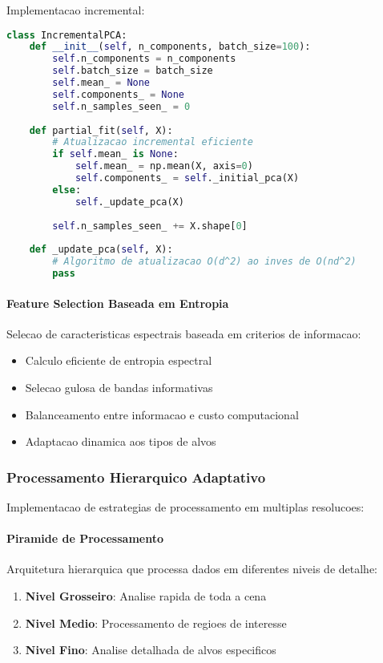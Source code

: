 Implementacao incremental:
\begin{lstlisting}[language=Python]
class IncrementalPCA:
    def __init__(self, n_components, batch_size=100):
        self.n_components = n_components
        self.batch_size = batch_size
        self.mean_ = None
        self.components_ = None
        self.n_samples_seen_ = 0
    
    def partial_fit(self, X):
        # Atualizacao incremental eficiente
        if self.mean_ is None:
            self.mean_ = np.mean(X, axis=0)
            self.components_ = self._initial_pca(X)
        else:
            self._update_pca(X)
        
        self.n_samples_seen_ += X.shape[0]
    
    def _update_pca(self, X):
        # Algoritmo de atualizacao O(d^2) ao inves de O(nd^2)
        pass
\end{lstlisting}

\paragraph{Feature Selection Baseada em Entropia}
Selecao de caracteristicas espectrais baseada em criterios de informacao:
\begin{itemize}
    \item Calculo eficiente de entropia espectral
    \item Selecao gulosa de bandas informativas
    \item Balanceamento entre informacao e custo computacional
    \item Adaptacao dinamica aos tipos de alvos
\end{itemize}

\subsubsection{Processamento Hierarquico Adaptativo}
Implementacao de estrategias de processamento em multiplas resolucoes:

\paragraph{Piramide de Processamento}
Arquitetura hierarquica que processa dados em diferentes niveis de detalhe:
\begin{enumerate}
    \item \textbf{Nivel Grosseiro}: Analise rapida de toda a cena
    \item \textbf{Nivel Medio}: Processamento de regioes de interesse
    \item \textbf{Nivel Fino}: Analise detalhada de alvos especificos
\end{enumerate}


